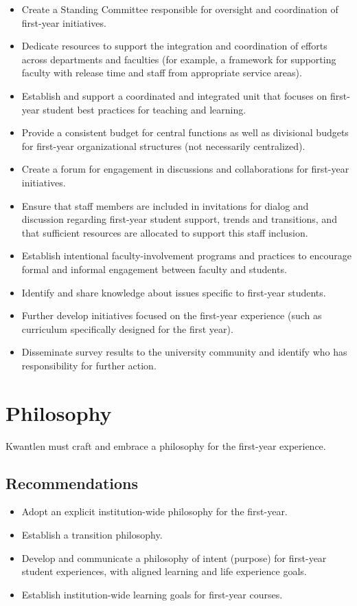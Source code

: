 \documentclass[11pt, letterpaper]{article}
\begin{document}
\begin{itemize}
\item
  Create a Standing Committee responsible for oversight and coordination
  of first-year initiatives.
\item
  Dedicate resources to support the integration and coordination of
  efforts across departments and faculties (for example, a framework for
  supporting faculty with release time and staff from appropriate
  service areas).
\item
  Establish and support a coordinated and integrated unit that focuses
  on first-year student best practices for teaching and learning.
\item
  Provide a consistent budget for central functions as well as
  divisional budgets for first-year organizational structures (not
  necessarily centralized).
\item
  Create a forum for engagement in discussions and collaborations for
  first-year initiatives.
\item
  Ensure that staff members are included in invitations for dialog and
  discussion regarding first-year student support, trends and
  transitions, and that sufficient resources are allocated to support
  this staff inclusion.
\item
  Establish intentional faculty-involvement programs and practices to
  encourage formal and informal engagement between faculty and students.
\item
  Identify and share knowledge about issues specific to first-year
  students.
\item
  Further develop initiatives focused on the first-year experience (such
  as curriculum specifically designed for the first year).
\item
  Disseminate survey results to the university community and identify
  who has responsibility for further action.
\end{itemize}
\newpage
\section{Philosophy}

Kwantlen must craft and embrace a philosophy for the
first-year experience.

\subsection{Recommendations}

\begin{itemize}
\item
  Adopt an explicit institution-wide philosophy for the first-year.
\item
  Establish a transition philosophy.
\item
  Develop and communicate a philosophy of intent (purpose) for
  first-year student experiences, with aligned learning and life experience goals.
\item
  Establish institution-wide learning goals for first-year courses.
\end{itemize}
\end{document}
